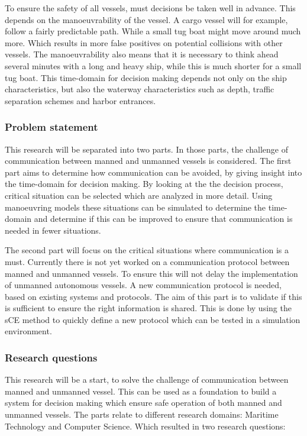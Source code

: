 To ensure the safety of all vessels, must decisions be taken well in advance. This depends on the manoeuvrability of the vessel. A cargo vessel will for example, follow a fairly predictable path. While a small tug boat might move around much more. Which results in more false positives on potential collisions with other vessels. The manoeuvrability also means that it is necessary to think ahead several minutes with a long and heavy ship, while this is much shorter for a small tug boat. This time-domain for decision making depends not only on the ship characteristics, but also the waterway characteristics such as depth, traffic separation schemes and harbor entrances.

\subsubsection*{Problem statement}
This research will be separated into two parts. In those parts, the challenge of communication between manned and unmanned vessels is considered. The first part aims to determine how communication can be avoided, by giving insight into the time-domain for decision making. By looking at the the decision process, critical situation can be selected which are analyzed in more detail. Using manoeuvring models these situations can be simulated to determine the time-domain and determine if this can be improved to ensure that communication is needed in fewer situations.

The second part will focus on the critical situations where communication is a must. Currently there is not yet worked on a communication protocol between manned and unmanned vessels. To ensure this will not delay the implementation of unmanned autonomous vessels. A new communication protocol is needed, based on existing systems and protocols. The aim of this part is to validate if this is sufficient to ensure the right information is shared. This is done by using the \acf{sCE} method to quickly define a new protocol which can be tested in a simulation environment.

\subsubsection*{Research questions}
This research will be a start, to solve the challenge of communication between manned and unmanned vessel. This can be used as a foundation to build a system for decision making which ensure safe operation of both manned and unmanned vessels. The parts relate to different research domains: Maritime Technology and Computer Science. Which resulted in two research questions:

